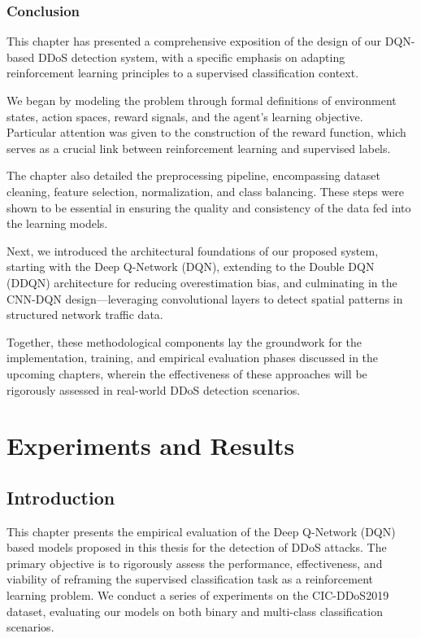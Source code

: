 \documentclass[12pt]{report}
\begin{document}
\subsection{Conclusion}

This chapter has presented a comprehensive exposition of the design of our DQN-based DDoS detection system, with a specific emphasis on adapting reinforcement learning principles to a supervised classification context. 

We began by modeling the problem through formal definitions of environment states, action spaces, reward signals, and the agent's learning objective. Particular attention was given to the construction of the reward function, which serves as a crucial link between reinforcement learning and supervised labels.

The chapter also detailed the preprocessing pipeline, encompassing dataset cleaning, feature selection, normalization, and class balancing. These steps were shown to be essential in ensuring the quality and consistency of the data fed into the learning models.

Next, we introduced the architectural foundations of our proposed system, starting with the Deep Q-Network (DQN), extending to the Double DQN (DDQN) architecture for reducing overestimation bias, and culminating in the CNN-DQN design—leveraging convolutional layers to detect spatial patterns in structured network traffic data.

Together, these methodological components lay the groundwork for the implementation, training, and empirical evaluation phases discussed in the upcoming chapters, wherein the effectiveness of these approaches will be rigorously assessed in real-world DDoS detection scenarios.



\chapter{Experiments and Results}
\label{chap:experiments}

\section{Introduction}
This chapter presents the empirical evaluation of the Deep Q-Network (DQN) based models proposed in this thesis for the detection of DDoS attacks. The primary objective is to rigorously assess the performance, effectiveness, and viability of reframing the supervised classification task as a reinforcement learning problem. We conduct a series of experiments on the CIC-DDoS2019 dataset, evaluating our models on both binary and multi-class classification scenarios.
\end{document}
